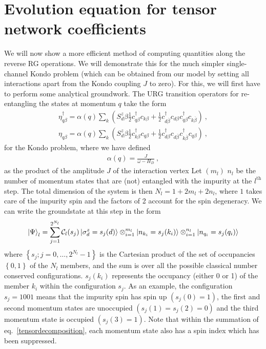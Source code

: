\documentclass[prb]{revtex4-2}
\begin{document}
\section{Evolution equation for tensor network coefficients}
We will now show a more efficient method of computing quantities along the reverse RG operations. We will demonstrate this for the much simpler single-channel Kondo problem (which can be obtained from our model by setting all interactions apart from the Kondo coupling \(J\) to zero). For this, we will first have to perform some analytical groundwork. The URG transition operators for re-entangling the states at momentum \(q\) take the form
\begin{equation}\begin{aligned}
	\eta_{q\beta}^\dagger = \alpha(q)\sum_{k} \left( S_d^z \beta \frac{1}{2}c^\dagger_{q\beta}c_{k\beta} + \frac{1}{2}c^\dagger_{d\overline\beta}c_{d\beta}c^\dagger_{q\beta}c_{k\overline\beta}\right) ~,\\
	\eta_{q\beta} = \alpha(q)\sum_{k} \left( S_d^z \beta \frac{1}{2}c^\dagger_{k\beta}c_{q\beta} + \frac{1}{2}c^\dagger_{d\beta}c_{d\overline\beta}c^\dagger_{k\overline\beta}c_{q\beta}\right)~,
\end{aligned}\end{equation}
for the Kondo problem, where we have defined 
\begin{equation}\begin{aligned}
	\alpha(q) = \frac{J}{\omega - H_D}~,
\end{aligned}\end{equation}
as the product of the amplitude \(J\) of the interaction vertex
Let \((m_l)\) \(n_l\) be the number of momentum states that are (not) entangled with the impurity at the \(l^\text{th}\) step. The total dimension of the system is then \(N_l = 1 + 2m_l + 2n_l\), where \(1\) takes care of the impurity spin and the factors of 2 account for the spin degeneracy. We can write the groundstate at this step in the form
\begin{equation}\begin{aligned}
	\ket{\Psi}_l = \sum_{j=1}^{2^{N_l}} \mathcal{C}_l(s_j)\ket{\sigma^z_d=s_j(d)}\otimes_{i=1}^{m_l}\ket{n_{k_i}=s_j(k_i) }\otimes_{i=1}^{n_l}\ket{n_{q_i}=s_j(q_i)}\label{tensordecomposition}
\end{aligned}\end{equation}
where \(\left\{ s_j; j=0,\ldots,2^{N_l}-1\right\} \) is the Cartesian product of the set of occupancies \(\left\{ 0,1 \right\} \) of the \(N_l\) members, and the sum is over all the possible classical number conserved configurations. \(s_j(k_i)\) represents the occupancy (either 0 or 1) of the member \(k_i\) within the configuration \(s_j\). As an example, the configuration \(s_j = 1001\) means that the impurity spin has spin up \(\left( s_j(0) = 1 \right) \), the first and second momentum states are unoccupied \(\left( s_j(1) = s_j(2) = 0 \right) \) and the third momentum state is occupied \(\left( s_j(3) = 1 \right) \). Note that within the summation of eq.~\ref{tensordecomposition}, each momentum state also has a spin index which has been suppressed.
\end{document}
